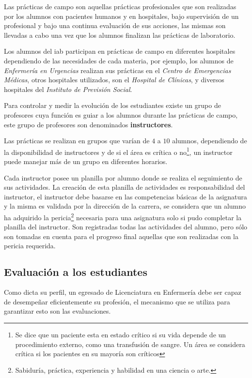 Las prácticas de campo son aquellas prácticas profesionales que son
realizadas por los alumnos con pacientes humanos y en hospitales, bajo
supervisión de un profesional y bajo una continua evaluación de sus
acciones, las mismas son llevadas a cabo una vez que los alumnos finalizan
las prácticas de laboratorio.


Los alumnos del \Gls{iab} participan en prácticas de campo 
en diferentes hospitales dependiendo de las necesidades de cada
materia, por ejemplo, los alumnos de \textit{Enfermería en Urgencias} realizan
sus prácticas en el \textit{Centro de Emergencias Médicas}, otros hospitales
utilizados, son el \textit{Hospital de Clínicas}, y diversos hospitales del
\textit{Instituto de Previsión Social}.


Para controlar y medir la evolución de los estudiantes existe un grupo de
profesores cuya función es guiar a los alumnos durante las prácticas de campo,
este grupo de profesores son denominados \textbf{instructores}.

Las prácticas se realizan en grupos que varían de $4$ a $10$ alumnos, dependiendo de
la disponibilidad de instructores y de si el área es crítica o no\footnote{Se
dice que un paciente esta en estado crítico si su vida depende de un
procedimiento externo, como una transfusión de sangre. Un área se considera
crítica si los pacientes en su mayoría son críticos}, un instructor puede
manejar más de un grupo en diferentes horarios. 

Cada instructor posee un planilla por alumno donde se realiza el seguimiento de
sus actividades. La creación de esta planilla de actividades es responsabilidad
del instructor, el instructor debe basarse en las competencias básicas de la
asignatura y la misma es validada por la dirección de la carrera, se considera
que un alumno ha adquirido la pericia\footnote{Sabiduría, práctica, experiencia y 
habilidad en una ciencia o arte.} necesaria para una asignatura solo si pudo
completar la planilla del instructor. Son registradas todas
las actividades del alumno, pero sólo son tomadas en cuenta para el progreso final 
aquellas que son realizadas con la pericia requerida.

\subsection{Evaluación a los estudiantes}
\label{sec:problema_evaluacion}

Como dicta su perfil, un egresado de Licenciatura en Enfermería 
debe ser capaz de desempeñar eficientemente su
profesión, el mecanismo que se utiliza para garantizar esto son las
evaluaciones.

